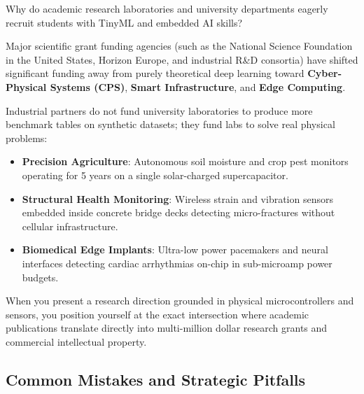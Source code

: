 \begin{iotbox}
Why do academic research laboratories and university departments eagerly recruit students with TinyML and embedded AI skills?

Major scientific grant funding agencies (such as the National Science Foundation in the United States, Horizon Europe, and industrial R\&D consortia) have shifted significant funding away from purely theoretical deep learning toward \textbf{Cyber-Physical Systems (CPS)}, \textbf{Smart Infrastructure}, and \textbf{Edge Computing}.

Industrial partners do not fund university laboratories to produce more benchmark tables on synthetic datasets; they fund labs to solve real physical problems:
\begin{itemize}
    \item \textbf{Precision Agriculture}: Autonomous soil moisture and crop pest monitors operating for 5 years on a single solar-charged supercapacitor.
    \item \textbf{Structural Health Monitoring}: Wireless strain and vibration sensors embedded inside concrete bridge decks detecting micro-fractures without cellular infrastructure.
    \item \textbf{Biomedical Edge Implants}: Ultra-low power pacemakers and neural interfaces detecting cardiac arrhythmias on-chip in sub-microamp power budgets.
\end{itemize}

When you present a research direction grounded in physical microcontrollers and sensors, you position yourself at the exact intersection where academic publications translate directly into multi-million dollar research grants and commercial intellectual property.
\end{iotbox}

\subsection{Common Mistakes and Strategic Pitfalls}\label{subsec:strategic_pitfalls}

